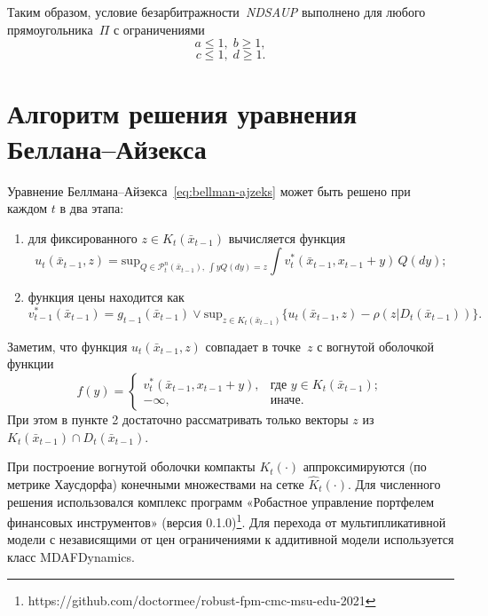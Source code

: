 \documentclass[a4paper, 12pt]{article}
\theoremstyle{def}
\theoremstyle{th}
\theoremstyle{rem}
\begin{document}
    Таким образом, условие безарбитражности~\textit{NDSAUP} выполнено для любого прямоугольника~$\Pi$ с ограничениями
    $$
        a \leqslant 1,\; b \geqslant 1,
    $$
    $$
        c \leqslant 1,\; d \geqslant 1.
    $$

    
    \section{Алгоритм решения уравнения Беллана--Айзекса}

    Уравнение Беллмана--Айзекса~\eqref{eq:bellman-ajzeks} может быть решено при каждом $t$ в два этапа:
    \begin{enumerate}
        \item для фиксированного $z \in K_t(\bar x_{t-1})$ вычисляется функция
        \begin{equation}
            u_t(\bar x_{t-1}, z) = \mathrm{sup}_{Q\in\mathcal{P}_t^n(\bar x_{t-1}),\, \int yQ(dy)=z}\int v_t^*(\bar x_{t-1}, x_{t-1} + y)\,Q(dy);
        \end{equation}
        \item функция цены находится как
        \begin{equation}
            v_{t-1}^*(\bar x_{t-1}) = g_{t-1}(\bar x_{t-1}) \lor \mathrm{sup}_{z \in K_t(\bar x_{t-1})} \{u_t(\bar x_{t-1}, z) - \rho(z|D_t(\bar x_{t-1})) \}.
        \end{equation}
    \end{enumerate}

    Заметим, что функция $u_t(\bar x_{t-1}, z)$ совпадает в точке~$z$ с вогнутой оболочкой функции
    \begin{equation}
        f(y) = 
        \begin{cases}
            v_t^*(\bar x_{t-1}, x_{t-1} + y),&\mbox{где $y \in K_t(\bar x_{t-1})$};\\
            -\infty, & \mbox{иначе}.
        \end{cases}
    \end{equation}
    При этом в пункте 2 достаточно рассматривать только векторы $z$ из $K_t(\bar x_{t-1}) \cap D_t(\bar x_{t-1})$.

    При построение вогнутой оболочки компакты $K_t(\cdot)$ аппроксимируются (по метрике Хаусдорфа) конечными множествами на сетке $\hat K_t(\cdot)$. Для численного решения использовался комплекс программ «Робастное управление портфелем финансовых инструментов» (версия 0.1.0)\footnote{https://github.com/doctormee/robust-fpm-cmc-msu-edu-2021}. Для перехода от мультипликативной модели с независящими от цен ограничениями к аддитивной модели используется класс MDAFDynamics.
\end{document}
